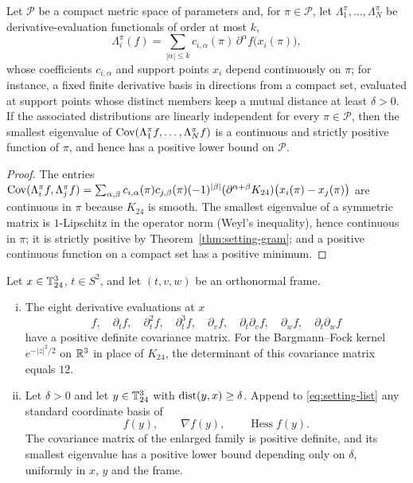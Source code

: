 \begin{corollary}\label{cor:setting-eigenfloor}
Let $\mathcal P$ be a compact metric space of parameters and, for $\pi\in\mathcal P$, let $\Lambda^\pi_1,\dots,\Lambda^\pi_N$ be derivative-evaluation functionals of order at most $k$,
\[
\Lambda^\pi_i(f)=\sum_{|\alpha|\le k}c_{i,\alpha}(\pi)\,\partial^\alpha f\bigl(x_i(\pi)\bigr),
\]
whose coefficients $c_{i,\alpha}$ and support points $x_i$ depend continuously on $\pi$; for instance, a fixed finite derivative basis in directions from a compact set, evaluated at support points whose distinct members keep a mutual distance at least $\delta>0$. If the associated distributions are linearly independent for every $\pi\in\mathcal P$, then the smallest eigenvalue of $\operatorname{Cov}(\Lambda^\pi_1f,\dots,\Lambda^\pi_Nf)$ is a continuous and strictly positive function of $\pi$, and hence has a positive lower bound on $\mathcal P$.
\end{corollary}

\begin{proof}
The entries $\operatorname{Cov}(\Lambda^\pi_if,\Lambda^\pi_jf)=\sum_{\alpha,\beta}c_{i,\alpha}(\pi)c_{j,\beta}(\pi)(-1)^{|\beta|}(\partial^{\alpha+\beta}K_{24})\bigl(x_i(\pi)-x_j(\pi)\bigr)$ are continuous in $\pi$ because $K_{24}$ is smooth. The smallest eigenvalue of a symmetric matrix is $1$-Lipschitz in the operator norm (Weyl's inequality), hence continuous in $\pi$; it is strictly positive by Theorem~\ref{thm:setting-gram}; and a positive continuous function on a compact set has a positive minimum.
\end{proof}

\begin{proposition}\label{prop:setting-frame}
Let $x\in\mathbb T^3_{24}$, $t\in S^2$, and let $(t,v,w)$ be an orthonormal frame.
\begin{enumerate}[(i)]
\item The eight derivative evaluations at $x$
\begin{equation}\label{eq:setting-list}
f,\quad\partial_tf,\quad\partial_t^2f,\quad\partial_t^3f,\quad\partial_vf,\quad\partial_t\partial_vf,\quad\partial_wf,\quad\partial_t\partial_wf
\end{equation}
have a positive definite covariance matrix. For the Bargmann--Fock kernel $e^{-|z|^2/2}$ on $\mathbb R^3$ in place of $K_{24}$, the determinant of this covariance matrix equals $12$.
\item Let $\delta>0$ and let $y\in\mathbb T^3_{24}$ with $\operatorname{dist}(y,x)\ge\delta$. Append to \eqref{eq:setting-list} any standard coordinate basis of
\begin{equation}\label{eq:setting-remote}
f(y),\qquad\nabla f(y),\qquad\operatorname{Hess}f(y).
\end{equation}
The covariance matrix of the enlarged family is positive definite, and its smallest eigenvalue has a positive lower bound depending only on $\delta$, uniformly in $x$, $y$ and the frame.
\end{enumerate}
\end{proposition}

